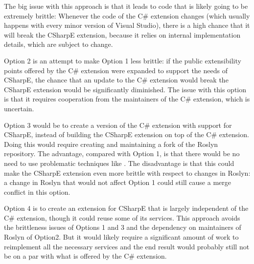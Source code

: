 
The big issue with this approach is that it leads to code that is likely going to be extremely brittle: Whenever the code of the C\# extension changes (which usually happens with every minor version of Visual Studio), there is a high chance that it will break the CSharpE extension, because it relies on internal implementation details, which are subject to change.

\medskip

Option 2 is an attempt to make Option 1 less brittle: if the public extensibility points offered by the C\# extension were expanded to support the needs of CSharpE, the chance that an update to the C\# extension would break the CSharpE extension would be significantly diminished. The issue with this option is that it requires cooperation from the maintainers of the C\# extension, which is uncertain.

\medskip

Option 3 would be to create a version of the C\# extension with support for CSharpE, instead of building the CSharpE extension on top of the C\# extension. Doing this would require creating and maintaining a fork of the Roslyn repository. The advantage, compared with Option 1, is that there would be no need to use problematic techniques like . The disadvantage is that this could make the CSharpE extension even more brittle with respect to changes in Roslyn: a change in Roslyn that would not affect Option 1 could still cause a merge conflict in this option.

\medskip

Option 4 is to create an extension for CSharpE that is largely independent of the C\# extension, though it could reuse some of its services. This approach avoids the brittleness issues of Options 1 and 3 and the dependency on maintainers of Roslyn of Option2. But it would likely require a significant amount of work to reimplement all the necessary services and the end result would probably still not be on a par with what is offered by the C\# extension.

\medskip

